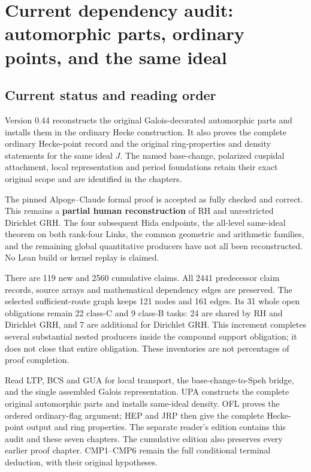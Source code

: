 \section{Current dependency audit: automorphic parts, ordinary points, and the same ideal}
\label{sec:dependency-audit-v44}

\subsection{Current status and reading order}

Version 0.44 reconstructs the original Galois-decorated automorphic
parts and installs them in the ordinary Hecke construction.  It also
proves the complete ordinary Hecke-point record and the original
ring-properties and density statements for the same ideal $J$.
The named base-change, polarized cuspidal attachment, local
representation and period foundations retain their exact original
scope and are identified in the chapters.

The pinned Alpoge--Claude formal proof is accepted as fully checked
and correct.  This remains a \textbf{partial human reconstruction}
of RH and unrestricted Dirichlet GRH.  The four subsequent Hida
endpoints, the all-level same-ideal theorem on both rank-four Links,
the common geometric and arithmetic families, and the remaining
global quantitative producers have not all been reconstructed.
No Lean build or kernel replay is claimed.

There are 119 new and 2560 cumulative claims.  All 2441
predecessor claim records, source arrays and mathematical dependency
edges are preserved.  The selected sufficient-route graph keeps
121 nodes and 161 edges.  Its 31 whole open obligations remain
22 class-C and 9 class-B tasks: 24 are shared by RH and Dirichlet
GRH, and 7 are additional for Dirichlet GRH.  This increment
completes several substantial nested producers inside the compound
support obligation; it does not close that entire obligation.
These inventories are not percentages of proof completion.

Read LTP, BCS and GUA for local transport, the base-change-to-Speh
bridge, and the single assembled Galois representation.  UPA
constructs the complete original automorphic parts and installs
same-ideal density.  OFL proves the ordered ordinary-flag argument;
HEP and JRP then give the complete Hecke-point output and ring
properties.  The separate reader's edition contains this audit and
these seven chapters.  The cumulative edition also preserves every
earlier proof chapter.  CMP1--CMP6 remain the full conditional
terminal deduction, with their original hypotheses.

